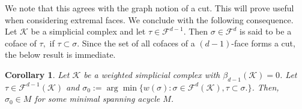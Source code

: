 \documentclass[12pt]{amsart}
\newcommand{\gt}[1]{\textcolor{blue}{#1}}
\newcommand{\remove}[1]{}
\renewcommand{\gt}[1]{#1}
\newtheorem{corollary}[theorem]{Corollary}
\numberwithin{equation}{section}
\numberwithin{theorem}{section}
\newcommand{\1}{\mathbf{1}}
\def\F{\mathcal{F}}
\def\K{\mathcal{K}}
\begin{document}
We note that this agrees with the graph notion of a cut. This will prove useful when considering extremal faces. We conclude with the following consequence. 
Let $\K$ be a simplicial complex and let $\tau \in \F^{d - 1}.$ Then $\sigma \in \F^d$ is said to be a coface of $\tau,$ if $\tau \subset \sigma.$ Since the set of all cofaces of a $(d - 1)$-face forms a cut, the below result is immediate.
%
\begin{corollary}
\label{cor:nng_MSA}
Let $\K$ be a weighted simplicial complex with $\beta_{d-1}(\K) = 0$. \remove{Then for any spanning acycle $S$, $supp(\partial S)$ is the set of all $(d-1)$-faces with a $d-$coface. Further, let} \gt{Let} $\tau \in \F^{d-1}(\K)$ and $\sigma_0 := \arg\min \{ w(\sigma) : \sigma \in \F^d(\K), \tau \subset \sigma. \}$. Then, $\sigma_0 \in M$ for some minimal spanning acycle $M$.
\end{corollary}
%
\end{document}
